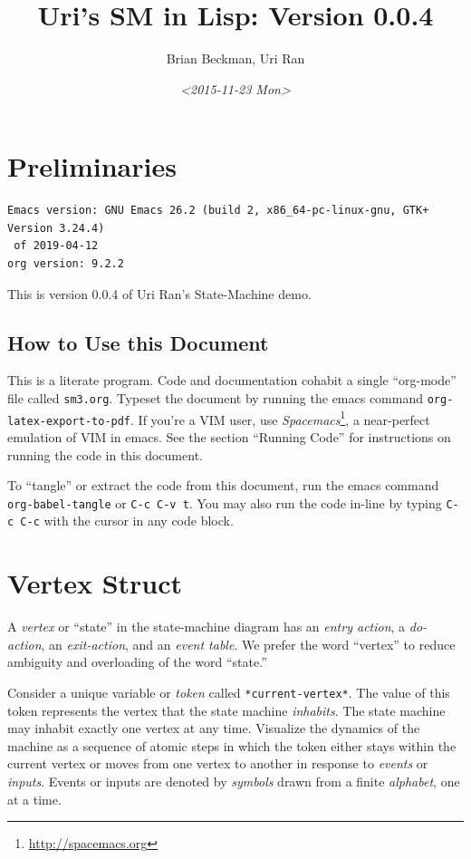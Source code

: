 \documentclass[10pt,oneside,x11names]{article}
\author{Brian Beckman, Uri Ran}
\date{\textit{<2015-11-23 Mon>}}
\title{Uri's SM in Lisp: Version 0.0.4}
\begin{document}
\maketitle
\setcounter{tocdepth}{2}
\tableofcontents


\section{Preliminaries}
\label{sec:org4bdd610}

\begin{verbatim}
Emacs version: GNU Emacs 26.2 (build 2, x86_64-pc-linux-gnu, GTK+ Version 3.24.4)
 of 2019-04-12
org version: 9.2.2
\end{verbatim}


This is version 0.0.4 of Uri Ran's State-Machine demo.

\subsection{How to Use this Document}
\label{sec:orga423b1a}

This is a literate program. Code and documentation cohabit a single
``org-mode'' file called \texttt{sm3.org}. Typeset the document by running the emacs
command \texttt{org-latex-export-to-pdf}. If you're a VIM user, use
\emph{Spacemacs}\footnote{\url{http://spacemacs.org}}, a near-perfect emulation of VIM in emacs. See the
section ``Running Code'' for instructions on running the code in this document.

To ``tangle'' or extract the code from this document, run the emacs command
\texttt{org-babel-tangle} or \texttt{C-c C-v t}. You may also run the code in-line by
typing \texttt{C-c C-c} with the cursor in any code block.

\section{Vertex Struct}
\label{sec:org21a659a}

A \emph{vertex} or ``state'' in the state-machine diagram has an \emph{entry action}, a
\emph{do-action}, an \emph{exit-action}, and an \emph{event table}.  We prefer the word
``vertex'' to reduce ambiguity and overloading of the word ``state.''

Consider a unique variable or \emph{token} called \texttt{*current-vertex*}. The value of
this token represents the vertex that the state machine \emph{inhabits}. The state
machine may inhabit exactly one vertex at any time. Visualize the dynamics of
the machine as a sequence of atomic steps in which the token
either stays within the current vertex or moves from one vertex to another in
response to \emph{events} or \emph{inputs}. Events or inputs are denoted by \emph{symbols}
drawn from a finite \emph{alphabet}, one at a time.
\end{document}
